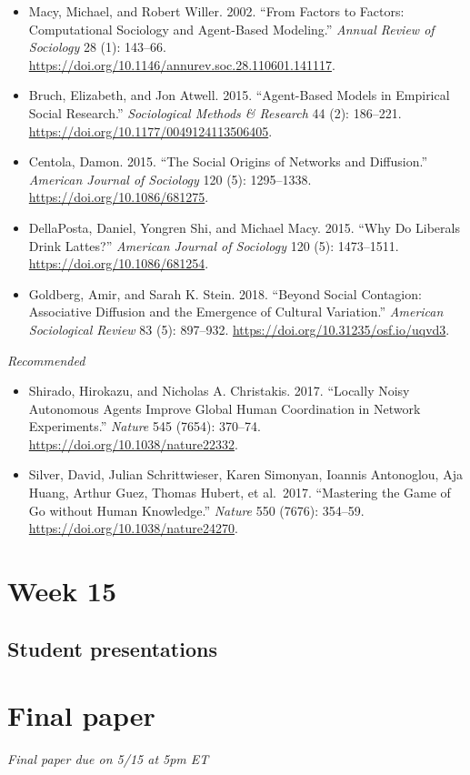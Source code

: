 \documentclass[
  10pt,
]{article}
\providecommand{\tightlist}{%
  \setlength{\itemsep}{0pt}\setlength{\parskip}{0pt}}
\begin{document}
\begin{itemize}
\tightlist
\item
  Macy, Michael, and Robert Willer. 2002. ``From Factors to Factors:
  Computational Sociology and Agent-Based Modeling.'' \emph{Annual
  Review of Sociology} 28 (1): 143--66.
  \url{https://doi.org/10.1146/annurev.soc.28.110601.141117}.
\item
  Bruch, Elizabeth, and Jon Atwell. 2015. ``Agent-Based Models in
  Empirical Social Research.'' \emph{Sociological Methods \& Research}
  44 (2): 186--221. \url{https://doi.org/10.1177/0049124113506405}.
\item
  Centola, Damon. 2015. ``The Social Origins of Networks and
  Diffusion.'' \emph{American Journal of Sociology} 120 (5): 1295--1338.
  \url{https://doi.org/10.1086/681275}.
\item
  DellaPosta, Daniel, Yongren Shi, and Michael Macy. 2015. ``Why Do
  Liberals Drink Lattes?'' \emph{American Journal of Sociology} 120 (5):
  1473--1511. \url{https://doi.org/10.1086/681254}.
\item
  Goldberg, Amir, and Sarah K. Stein. 2018. ``Beyond Social Contagion:
  Associative Diffusion and the Emergence of Cultural Variation.''
  \emph{American Sociological Review} 83 (5): 897--932.
  \url{https://doi.org/10.31235/osf.io/uqvd3}.
\end{itemize}

\emph{Recommended}

\begin{itemize}
\tightlist
\item
  Shirado, Hirokazu, and Nicholas A. Christakis. 2017. ``Locally Noisy
  Autonomous Agents Improve Global Human Coordination in Network
  Experiments.'' \emph{Nature} 545 (7654): 370--74.
  \url{https://doi.org/10.1038/nature22332}.
\item
  Silver, David, Julian Schrittwieser, Karen Simonyan, Ioannis
  Antonoglou, Aja Huang, Arthur Guez, Thomas Hubert, et al.~2017.
  ``Mastering the Game of Go without Human Knowledge.'' \emph{Nature}
  550 (7676): 354--59. \url{https://doi.org/10.1038/nature24270}.
\end{itemize}

\hypertarget{week-15}{%
\section{Week 15}\label{week-15}}

\hypertarget{student-presentations}{%
\subsection{Student presentations}\label{student-presentations}}

\hypertarget{final-paper}{%
\section{Final paper}\label{final-paper}}

\emph{Final paper due on 5/15 at 5pm ET}
\end{document}

